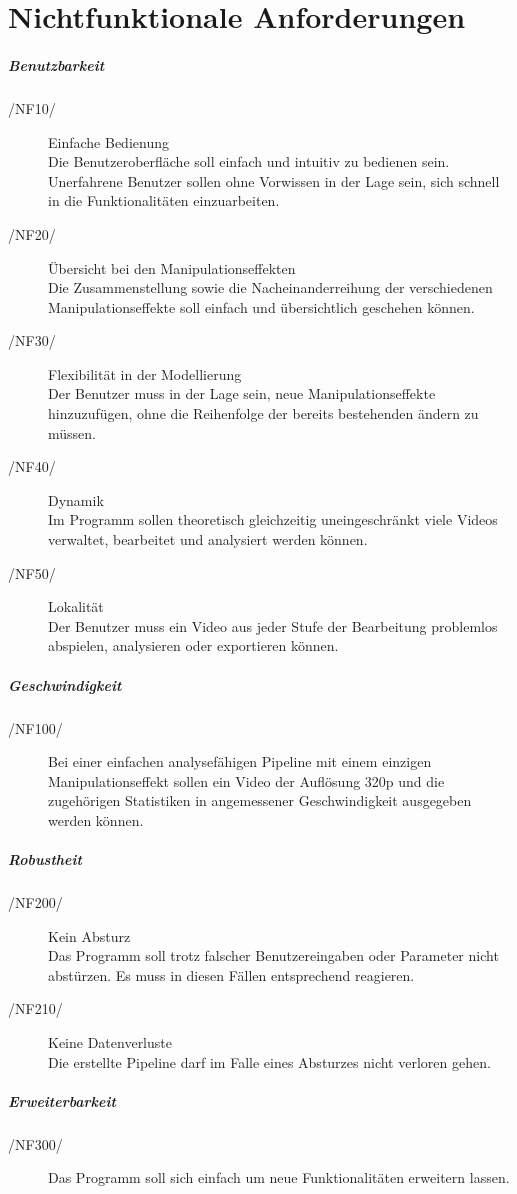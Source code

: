 \section{Nichtfunktionale Anforderungen}

\subparagraph{Benutzbarkeit}
\begin{description}
	\item[/NF10/] Einfache Bedienung \\ Die Benutzeroberfläche soll einfach und intuitiv zu bedienen sein. Unerfahrene Benutzer sollen ohne Vorwissen in der Lage sein, sich schnell in die Funktionalitäten einzuarbeiten.
	\item[/NF20/] Übersicht bei den Manipulationseffekten \\ Die Zusammenstellung sowie die Nacheinanderreihung der verschiedenen Manipulationseffekte soll einfach und übersichtlich geschehen können. 
	\item[/NF30/] Flexibilität in der Modellierung \\ Der Benutzer muss in der Lage sein, neue Manipulationseffekte hinzuzufügen, ohne die Reihenfolge der bereits bestehenden ändern zu müssen.
	\item[/NF40/] Dynamik \\ Im Programm sollen theoretisch gleichzeitig uneingeschränkt viele Videos verwaltet, bearbeitet und analysiert werden können.
	\item[/NF50/] Lokalität  \\ Der Benutzer muss ein Video aus jeder Stufe der Bearbeitung problemlos abspielen, analysieren oder exportieren können.
\end{description}

\subparagraph{Geschwindigkeit}

\begin{description}
	\item[/NF100/] Bei einer einfachen analysefähigen Pipeline mit einem einzigen Manipulationseffekt sollen ein Video der Auflösung 320p und die zugehörigen Statistiken in angemessener Geschwindigkeit
 ausgegeben werden können.
\end{description}

\subparagraph{Robustheit}

\begin{description}
	\item[/NF200/] Kein Absturz \\ Das Programm soll trotz falscher Benutzereingaben oder Parameter nicht abstürzen. Es muss in diesen Fällen entsprechend reagieren.
	\item[/NF210/] Keine Datenverluste \\ Die erstellte Pipeline darf im Falle eines Absturzes nicht verloren gehen.

\end{description}

\subparagraph{Erweiterbarkeit}

\begin{description} 
	\item[/NF300/] Das Programm soll sich einfach um neue Funktionalitäten erweitern lassen.
\end{description}
